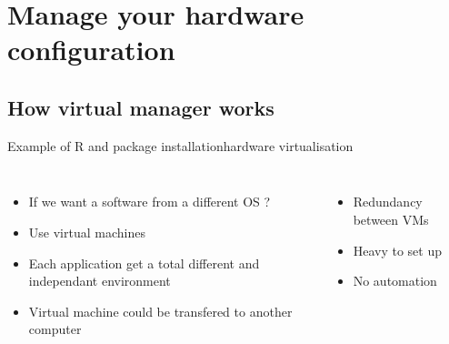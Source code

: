 \section{Manage your hardware configuration}
\subsection{How virtual manager works}

\begin{frame}{Example of R and package installation}{hardware virtualisation}
\begin{columns}
\begin{itemize}[<+->]
	\item If we want a software from a different OS ?
	\item Use virtual machines
	\item Each application get a total different and independant environment
	\item Virtual machine could be transfered to another computer
\end{itemize}
\begin{itemize}[<+->]
	\item Redundancy between VMs
	\item Heavy to set up
	\item No automation
\end{itemize}
\end{columns}
\end{frame}
\begin{frame}
\end{frame}

